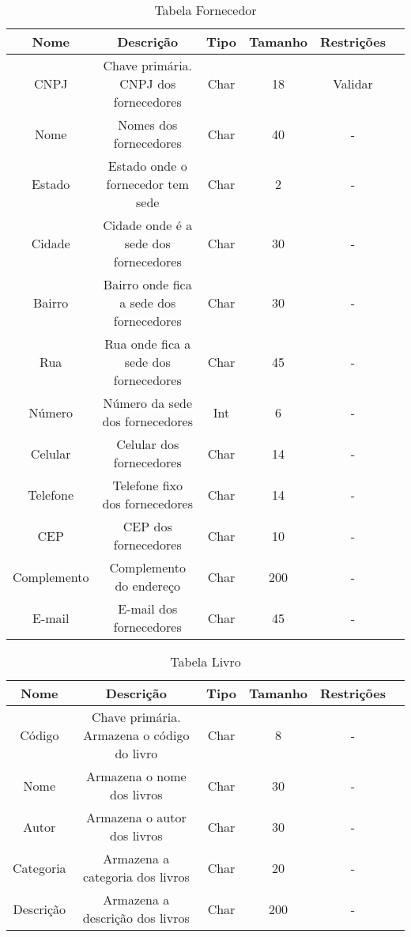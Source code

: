 \begin{table}[htbp]
\caption{Tabela Fornecedor}
\begin{center}
\begin{tabular}{|c|c|c|c|c|c|}
\hline
Nome & Descrição & Tipo & Tamanho & Restrições \\ \hline
CNPJ & Chave primária. CNPJ dos fornecedores & Char & 18 & Validar \\ \hline
Nome & Nomes dos fornecedores & Char & 40 & - \\ \hline
Estado & Estado onde o fornecedor tem sede & Char & 2 & - \\ \hline
Cidade & Cidade onde é a sede dos fornecedores & Char & 30 & - \\ \hline
Bairro & Bairro onde fica a sede dos fornecedores & Char & 30 & - \\ \hline
Rua & Rua onde fica a sede dos fornecedores & Char & 45 & - \\ \hline
Número & Número da sede dos fornecedores & Int & 6 & - \\ \hline
Celular & Celular dos fornecedores & Char & 14 & - \\ \hline
Telefone & Telefone fixo dos fornecedores & Char & 14 & - \\ \hline
CEP & CEP dos fornecedores & Char & 10 & - \\ \hline
Complemento & Complemento do endereço & Char & 200 & - \\ \hline
E-mail & E-mail dos fornecedores & Char & 45 & - \\ \hline
\end{tabular}
\end{center}
\label{tabela_fornecedor}
\end{table}
%
%
\begin{table}[htbp]
\caption{Tabela Livro}
\begin{center}
\begin{tabular}{|c|c|c|c|c|c|}
\hline
Nome & Descrição & Tipo & Tamanho & Restrições \\ \hline
 Código & Chave primária. Armazena o código do livro & Char & 8 & - \\ \hline
 Nome  & Armazena o nome dos livros & Char & 30 &- \\ \hline
 Autor & Armazena o autor dos livros & Char & 30 &- \\ \hline
 Categoria  & Armazena a categoria dos livros  & Char & 20 &- \\ \hline
 Descrição  & Armazena a descrição dos livros  & Char & 200 &- \\ \hline
\end{tabular}
\end{center}
\label{tabela_livro}
\end{table}
